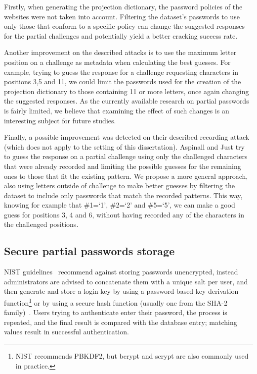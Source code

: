       Firstly, when generating the projection dictionary, the password policies of the websites were not taken into account. Filtering the dataset's passwords to use only those that conform to a specific policy can change the suggested responses for the partial challenges and potentially yield a better cracking success rate.

      Another improvement on the described attacks is to use the maximum letter position on a challenge as metadata when calculating the best guesses. For example, trying to guess the response for a challenge requesting characters in positions 3,5 and 11, we could limit the passwords used for the creation of the projection dictionary to those containing 11 or more letters, once again changing the suggested responses. As the currently available research on partial passwords is fairly limited, we believe that examining the effect of such changes is an interesting subject for future studies.

      Finally, a possible improvement was detected on their described recording attack (which does not apply to the setting of this dissertation). Aspinall and Just try to guess the response on a partial challenge using only the challenged characters that were already recorded and limiting the possible guesses for the remaining ones to those that fit the existing pattern. We propose a more general approach, also using letters outside of challenge to make better guesses by filtering the dataset to include only passwords that match the recorded patterns. This way, knowing for example that \#1=`1', \#2=`2' and \#5=`5', we can make a good guess for positions 3, 4 and 6, without having recorded any of the characters in the challenged positions.


    \subsection{Secure partial passwords storage}
      \label{ssec:secure_store}
      NIST guidelines~\cite{NIST_old,NIST_storage} recommend against storing passwords unencrypted, instead administrators are advised to concatenate them with a unique salt per user, and then generate and store a login key by using a password-based key derivation function\footnote{NIST recommends PBKDF2, but bcrypt and scrypt are also commonly used in practice.} or by using a secure hash function (usually one from the SHA-2 family)~\cite{fips_SHS}. Users trying to authenticate enter their password, the process is repeated, and the final result is compared with the database entry; matching values result in successful authentication.

